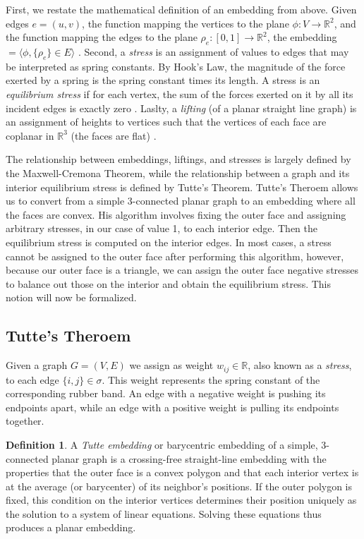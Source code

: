 \documentclass[11pt]{article}
\newcommand{\R}{\mathbb{R}}
\theoremstyle{definition}
\newtheorem{definition}{Definition}[section]
\begin{document}
	First, we restate the mathematical definition of an embedding from above. 
	Given edges $e=(u,v)$, the function mapping the vertices to the plane $ \phi :V \rightarrow \R^2$, and the function mapping the edges to the plane $ \rho_e :[0,1] \rightarrow \R^2$, the embedding $= \langle \phi, \{\rho_e\} \in E \rangle$ \cite{mathworld:Embedding}.
	Second, a \emph{stress} is an assignment of values to edges that may be interpreted as spring constants. 
	By Hook's Law, the magnitude of the force exerted by a spring is the spring constant times its length. 
	A stress is an \emph{equilibrium stress} if for each vertex, the sum of the forces exerted on it by all its incident edges is exactly zero \cite{AresRiboMor}.
	Laslty, a \emph{lifting} (of a planar straight line graph) is an assignment of heights to vertices such that the vertices of each face are coplanar in $\R^3$ (the faces are flat) \cite{WhiteleyHandbook}.

  	The relationship between embeddings, liftings, and stresses is largely defined by the Maxwell-Cremona Theorem, while the relationship between a graph and its interior equilibrium stress is defined by Tutte's Theorem.  
	Tutte's Theroem allows us to convert from a simple 3-connected planar graph to an embedding where all the faces are convex. 
	His algorithm involves fixing the outer face and assigning arbitrary stresses, in our case of value 1, to each interior edge. 
	Then the equilibrium stress is computed on the interior edges. 
	In most cases, a stress cannot be assigned to the outer face after performing this algorithm, however, because our outer face is a triangle, we can assign the outer face negative stresses to balance out those on the interior and obtain the equilibrium stress. 
	This notion will now be formalized.

\subsection{Tutte's Theroem}

	Given a graph $G=(V,E)$ we assign as weight $w_{ij}\in\R$, also known as a \emph{stress}, to each edge $\{i,j\}\in\sigma$. 
	This weight represents the spring constant of the corresponding rubber band. 
	An edge with a negative weight is pushing its endpoints apart, while an edge with a positive weight is pulling its endpoints together.
  	
	\theoremstyle{definition}
	\begin{definition}
 		A \emph{Tutte embedding} or barycentric embedding of a simple, 3-connected planar graph is a crossing-free straight-line embedding with the properties that the outer face is a convex polygon and that each interior vertex is at the average (or barycenter) of its neighbor's positions. 
		If the outer polygon is fixed, this condition on the interior vertices determines their position uniquely as the solution to a system of linear equations. 
		Solving these equations thus produces a planar embedding. 
  	\end{definition}
	
\end{document}
